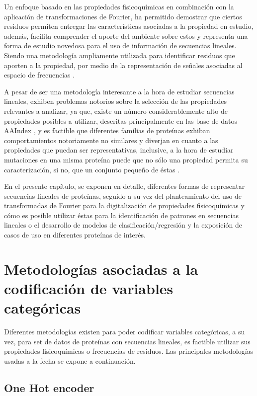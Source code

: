 Un enfoque basado en las propiedades fisicoquímicas en combinación con la aplicación de transformaciones de Fourier, ha permitido demostrar que ciertos residuos permiten entregar las características asociadas a la propiedad en estudio, además, facilita comprender el aporte del ambiente sobre estos y representa una forma de estudio novedosa para el uso de información de secuencias lineales. Siendo una metodología ampliamente utilizada para identificar residuos que aporten a la propiedad, por medio de la representación de señales asociadas al espacio de frecuencias \cite{veljkovic1985possible, cosic2016analysis, cadet2018application}.

A pesar de ser una metodología interesante a la hora de estudiar secuencias lineales, exhiben problemas notorios sobre la selección de las propiedades relevantes a analizar, ya que, existe un número considerablemente alto de propiedades posibles a utilizar, descritas principalmente en las base de datos AAIndex \cite{Kawashima2000}, y es factible que diferentes familias de proteínas exhiban comportamientos notoriamente no similares y diverjan en cuanto a las propiedades que puedan ser representativas, inclusive, a la hora de estudiar mutaciones en una misma proteína puede que no sólo una propiedad permita su caracterización, si no, que un conjunto pequeño de éstas \cite{cadet2018application}.

En el presente capítulo, se exponen en detalle, diferentes formas de representar secuencias lineales de proteínas, seguido a su vez del planteamiento del uso de transformadas de Fourier para la digitalización de propiedades fisicoquímicas y cómo es posible utilizar éstas para la identificación de patrones en secuencias lineales o el desarrollo de modelos de clasificación/regresión y la exposición de casos de uso en diferentes proteínas de interés. 

\section{Metodologías asociadas a la codificación de variables categóricas}

Diferentes metodologías existen para poder codificar variables categóricas, a su vez, para set de datos de proteínas con secuencias lineales, es factible utilizar sus propiedades fisicoquímicas o frecuencias de residuos. Las principales metodologías usadas a la fecha se expone a continuación.

\subsection{One Hot encoder}


